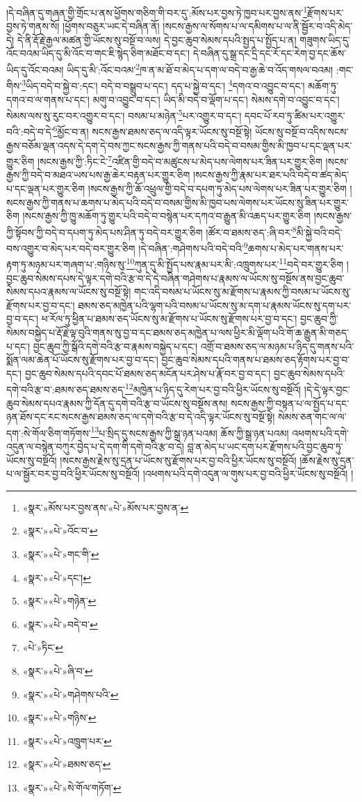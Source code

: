 །དེ་བཞིན་དུ་གཞན་གྱི་གྲོང་པ་ནས་ཕྱོགས་གཅིག་གི་བར་དུ་:མོས་པར་བྱས་ཏེ་ཁྱབ་པར་བྱས་ནས་\footnote{«སྣར་»མོས་པར་བྱས་ནས་«པེ་»མོས་པར་བྱས་ན་}རྫོགས་པར་བྱས་ཏེ་གནས་སོ། །ཕྱོགས་བཅུར་ཡང་དེ་བཞིན་ནོ། །སངས་རྒྱས་ལ་སོགས་པ་ལ་དམིགས་པ་ལ་ནི་སྦྱོར་བ་འདི་མེད་དེ། དེ་ནི་རྡོ་རྗེ་རྒྱལ་མཚན་གྱི་ཡོངས་སུ་བསྔོ་བ་ལས། དེ་བྱང་ཆུབ་སེམས་དཔའི་སྤྱད་པ་སྤྱོད་པ་ན། གཟུགས་ཡིད་དུ་འོང་བའམ་ཡིད་དུ་མི་འོང་བ་གང་ཇི་སྙེད་ཅིག་མཐོང་བ་དང་། དེ་བཞིན་དུ་སྒྲ་དང་དྲི་དང་རོ་དང་རེག་བྱ་དང་ཆོས་ཡིད་དུ་འོང་བའམ། ཡིད་དུ་མི་:འོང་བའམ་\footnote{«སྣར་»«པེ་»འོང་བ་}ཁ་ན་མ་ཐོ་བ་མེད་པ་དག་ལ་བདེ་བ་རྒྱ་ཆེ་བ་འོད་གསལ་བའམ། :གང་གིས་\footnote{«སྣར་»«པེ་»གང་གི་}ཡིད་བདེ་བ་སྐྱེ་བ་:དང་། བདེ་བ་བསྒྲུབ་པ་དང་། དད་པ་སྐྱེ་བ་དང་། \footnote{«སྣར་»«པེ་»དང་།  }དགའ་བ་འབྱུང་བ་དང་། མཆོག་ཏུ་དགའ་བ་ལ་གནས་པ་དང་། མགུ་བ་འབྱུང་བ་དང་། ཡིད་མི་བདེ་བ་ལྡོག་པ་དང་། སེམས་དགེ་བ་འབྱུང་བ་དང་། སེམས་ལས་སུ་རུང་བར་འགྱུར་བ་དང་། བསམ་པ་མཉེན་\footnote{«སྣར་»«པེ་»གཉེན་}པར་འགྱུར་བ་དང་། དབང་པོ་རབ་ཏུ་ཚིམ་པར་འགྱུར་བའི་:བདེ་བ་དེ་\footnote{«སྣར་»«པེ་»བདེ་བ་}མྱོང་བ་ན། སངས་རྒྱས་ཐམས་ཅད་ལ་འདི་ལྟར་ཡོངས་སུ་བསྔོ་སྟེ། ཡོངས་སུ་བསྔོ་བ་འདིས་སངས་རྒྱས་བཅོམ་ལྡན་འདས་དེ་དག་དེ་བས་ཀྱང་སངས་རྒྱས་ཀྱི་གནས་པའི་བདེ་བ་བསམ་གྱིས་མི་ཁྱབ་པ་དང་ལྡན་པར་གྱུར་ཅིག །སངས་རྒྱས་ཀྱི་:ཏིང་ངེ་\footnote{«པེ་»ཏིང་}འཛིན་གྱི་བདེ་བ་མཚུངས་པ་མེད་པས་ལེགས་པར་ཟིན་པར་གྱུར་ཅིག །སངས་རྒྱས་ཀྱི་བདེ་བ་མཐའ་ཡས་པས་རྒྱ་ཆེར་བརྟན་པར་གྱུར་ཅིག །སངས་རྒྱས་ཀྱི་རྣམ་པར་ཐར་པའི་བདེ་བ་ཚད་མེད་པ་དང་ལྡན་པར་གྱུར་ཅིག །སངས་རྒྱས་ཀྱི་ཆོ་འཕྲུལ་གྱི་བདེ་བ་དཔག་ཏུ་མེད་པས་ལེགས་པར་ཟིན་པར་གྱུར་ཅིག །སངས་རྒྱས་ཀྱི་གནས་པ་ཆགས་པ་མེད་པའི་བདེ་བ་བསམ་གྱིས་མི་ཁྱབ་པས་ལེགས་པར་ཡོངས་སུ་ཟིན་པར་གྱུར་ཅིག །སངས་རྒྱས་ཀྱི་ཁྱུ་མཆོག་ཏུ་གྱུར་པའི་བདེ་བ་བསྙེན་པར་དཀའ་བ་རྒྱུན་མི་འཆད་པར་གྱུར་ཅིག །སངས་རྒྱས་ཀྱི་སྟོབས་ཀྱི་བདེ་བ་དཔག་ཏུ་མེད་པས་ཤིན་ཏུ་བདེ་བར་གྱུར་ཅིག །ཚོར་བ་ཐམས་ཅད་:ཞི་བར་\footnote{«སྣར་»«པེ་»ཞི་བ་}མི་སྐྱེ་བའི་བདེ་བས་འགྱུར་བ་མེད་པར་བདེ་བར་གྱུར་ཅིག །དེ་བཞིན་:གཤེགས་པའི་བདེ་བའི་\footnote{«སྣར་»«པེ་»གཤེགས་པའི་}ཆགས་པ་མེད་པར་གནས་པར་རྟག་ཏུ་མཉམ་པར་གཞག་པ་:གཉིས་སུ་\footnote{«སྣར་»«པེ་»གཉིས་}ཀུན་དུ་མི་སྤྱོད་པས་རྣམ་པར་མི་:འཁྲུགས་པར་\footnote{«སྣར་»«པེ་»འཁྲུག་པར་}བདེ་བར་གྱུར་ཅིག །བྱང་ཆུབ་སེམས་དཔས་དེ་ལྟར་དགེ་བའི་རྩ་བ་དེ་དེ་བཞིན་གཤེགས་པ་རྣམས་ལ་ཡོངས་སུ་བསྔོས་ནས་བྱང་ཆུབ་སེམས་དཔའ་རྣམས་ལ་ཡོངས་སུ་བསྔོ་སྟེ། གང་འདི་བསམ་པ་ཡོངས་སུ་མ་རྫོགས་པ་རྣམས་ཀྱི་བསམ་པ་ཡོངས་སུ་རྫོགས་པར་བྱ་བ་དང་། ཐམས་ཅད་མཁྱེན་པའི་ལྷག་པའི་བསམ་པ་ཡོངས་སུ་མ་དག་པ་རྣམས་ཡོངས་སུ་དག་པར་བྱ་བ་དང་། ཕ་རོལ་ཏུ་ཕྱིན་པ་ཐམས་ཅད་ཡོངས་སུ་མ་རྫོགས་པ་ཡོངས་སུ་རྫོགས་པར་བྱ་བ་དང་། བྱང་ཆུབ་ཀྱི་སེམས་བསྐྱེད་པ་རྡོ་རྗེ་ལྟ་བུའི་གནས་སུ་བྱ་བ་དང་ཐམས་ཅད་མཁྱེན་པ་ལས་ཕྱིར་མི་ལྡོག་པའི་གོ་ཆ་རྒྱུན་མི་གཅད་པ་དང་། བྱང་ཆུབ་ཀྱི་སྒོའི་དགེ་བའི་རྩ་བ་རྣམས་བསྐྱེད་པ་དང་། འགྲོ་བ་ཐམས་ཅད་ལ་མཉམ་པ་ཉིད་དུ་གནས་པའི་སྨོན་ལམ་ཆེན་པོ་ཡོངས་སུ་རྫོགས་པར་བྱ་བ་དང་། བྱང་ཆུབ་སེམས་དཔའི་གནས་པ་ཐམས་ཅད་རྟོགས་པར་བྱ་བ་དང་། བྱང་ཆུབ་སེམས་དཔའི་དབང་པོ་ཐམས་ཅད་མངོན་པར་ཤེས་པ་རྣོ་བར་བྱ་བ་དང་། བྱང་ཆུབ་སེམས་དཔའི་དགེ་བའི་རྩ་བ་:ཐམས་ཅད་ཐམས་ཅད་\footnote{«སྣར་»«པེ་»ཐམས་ཅད་}མཁྱེན་པ་ཉིད་དུ་རེག་པར་བྱ་བའི་ཕྱིར་ཡོངས་སུ་བསྔོའོ། །དེ་དེ་ལྟར་བྱང་ཆུབ་སེམས་དཔའ་རྣམས་ཀྱི་དོན་དུ་དགེ་བའི་རྩ་བ་ཡོངས་སུ་བསྔོས་ནས། སངས་རྒྱས་ཀྱི་བསྟན་པ་ལ་སྤྱོད་པ་དང་ཉན་ཐོས་དང་རང་སངས་རྒྱས་ཐམས་ཅད་ལ་དགེ་བའི་རྩ་བ་དེ་འདི་ལྟར་ཡོངས་སུ་བསྔོ་སྟེ། སེམས་ཅན་གང་ལ་ལ་དག་:སེ་གོལ་ཅིག་གཏོགས་\footnote{«སྣར་»«པེ་»སེ་གོལ་གཏོག་}པ་སྲིད་དུ་སངས་རྒྱས་ཀྱི་སྒྲ་ཉན་པའམ། ཆོས་ཀྱི་སྒྲ་ཉན་པའམ། འཕགས་པའི་དགེ་འདུན་ལ་བསྙེན་བཀུར་བྱེད་པ་དེ་དག་གི་དགེ་བའི་རྩ་བ་དེ། བླ་ན་མེད་པ་ཡང་དག་པར་རྫོགས་པའི་བྱང་ཆུབ་ཏུ་ཡོངས་སུ་བསྔོའོ། །སངས་རྒྱས་རྗེས་སུ་དྲན་པ་ཡོངས་སུ་རྫོགས་པར་བྱ་བའི་ཕྱིར་ཡོངས་སུ་བསྔོའོ། །ཆོས་རྗེས་སུ་དྲན་པ་ལ་སྦྱོར་བར་བྱ་བའི་ཕྱིར་ཡོངས་སུ་བསྔོའོ། །འཕགས་པའི་དགེ་འདུན་ལ་གུས་པར་བྱ་བའི་ཕྱིར་ཡོངས་སུ་བསྔོའོ། །
